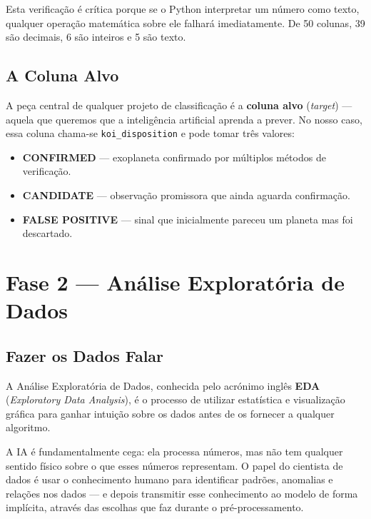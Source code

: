 \documentclass[12pt, a4paper]{report}
\begin{document}
Esta verificação é crítica porque se o Python interpretar um número como texto, qualquer operação matemática sobre ele falhará imediatamente. De 50 colunas, 39 são decimais, 6 são inteiros e 5 são texto.

\section{A Coluna Alvo}

A peça central de qualquer projeto de classificação é a \textbf{coluna alvo} (\textit{target}) — aquela que queremos que a inteligência artificial aprenda a prever. No nosso caso, essa coluna chama-se \texttt{koi\_disposition} e pode tomar três valores:

\begin{itemize}
    \item \textcolor{verdeconfirmed}{\textbf{CONFIRMED}} — exoplaneta confirmado por múltiplos métodos de verificação.
    \item \textcolor{azulcandidate}{\textbf{CANDIDATE}} — observação promissora que ainda aguarda confirmação.
    \item \textcolor{vermelhofalso}{\textbf{FALSE POSITIVE}} — sinal que inicialmente pareceu um planeta mas foi descartado.
\end{itemize}

\chapter{Fase 2 — Análise Exploratória de Dados}

\section{Fazer os Dados Falar}

A Análise Exploratória de Dados, conhecida pelo acrónimo inglês \textbf{EDA} (\textit{Exploratory Data Analysis}), é o processo de utilizar estatística e visualização gráfica para ganhar intuição sobre os dados antes de os fornecer a qualquer algoritmo.

A IA é fundamentalmente cega: ela processa números, mas não tem qualquer sentido físico sobre o que esses números representam. O papel do cientista de dados é usar o conhecimento humano para identificar padrões, anomalias e relações nos dados — e depois transmitir esse conhecimento ao modelo de forma implícita, através das escolhas que faz durante o pré-processamento.
\end{document}
